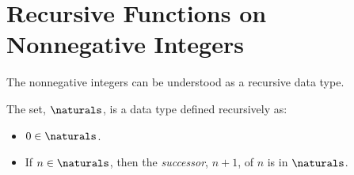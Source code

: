 \iffalse

Now suppose $s = \lefbrk\rhtbrk\lefbrk\rhtbrk\lefbrk\rhtbrk\lefbrk\rhtbrk$.



Let $a$ be the string $\lefbrk\lefbrk\rhtbrk\rhtbrk \in M$ built by two successive
applications of the first $M$ constructor starting with $\emptystring$.  Next
let $b \eqdef aa$ and $c \eqdef bb$, each built by successive applications
of the second $M$ constructor.

Alternatively, we can build $ba$ from the second constructor with $s=b$
and $t=a$, and then get to $c$ using the second constructor with $s=ba$
and $t=a$.

Now by these rules, $f(a) = 2$, and $f(b) = (2+1)(2+1)=9$.  This means
that $f(c) = f(bb)= (9+1)(9+1)=100$.

But also $f(ba) = (9+1)(2+1) = 27$, so that $f(c) = f(ba\,a) = (27 +1)
(2+1) = 84$.

The outcome is that $f(c)$ is defined to be both 100 and 84, which shows
that the rules defining $f$ are inconsistent.

On the other hand, structural induction remains a sound proof method even
for ambiguous recursive definitions, which is why it is easy to prove
that $M=\RM$.
\fi

\begin{problems}

\practiceproblems
{}

\classproblems
{}

\end{problems}


\section{Recursive Functions on Nonnegative Integers}

The nonnegative integers can be understood as a recursive data type.
\begin{definition}\label{0succ}
The set, $\naturals$, is a data type defined recursively as:
\begin{itemize}
\item $0 \in \naturals$.
\item If $n \in \naturals$, then the \emph{successor}, $n+1$, of $n$ is in
$\naturals$.
\end{itemize}

\end{definition}

